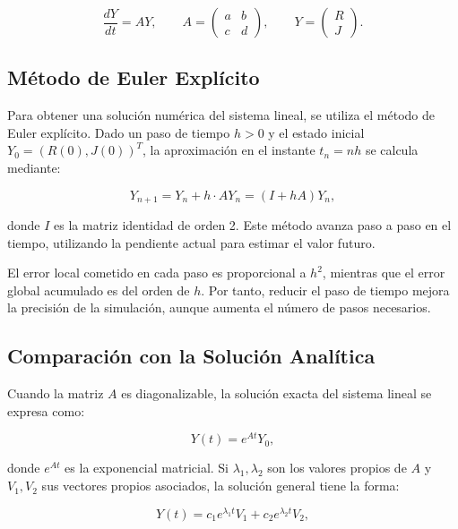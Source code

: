 \documentclass[12pt]{article}
\begin{document}
\begin{equation}
\frac{dY}{dt} = AY, \qquad
A = \begin{pmatrix} a & b \\ c & d \end{pmatrix}, \qquad
Y = \begin{pmatrix} R \\ J \end{pmatrix}.
\end{equation}

\subsection{Método de Euler Explícito}

Para obtener una solución numérica del sistema lineal, se utiliza el método de Euler explícito. Dado un paso de tiempo $h > 0$ y el estado inicial $Y_0 = (R(0), J(0))^T$, la aproximación en el instante $t_n = nh$ se calcula mediante:

\begin{equation}
Y_{n+1} = Y_n + h \cdot A Y_n = (I + hA) Y_n,
\end{equation}

donde $I$ es la matriz identidad de orden 2. Este método avanza paso a paso en el tiempo, utilizando la pendiente actual para estimar el valor futuro.

El error local cometido en cada paso es proporcional a $h^2$, mientras que el error global acumulado es del orden de $h$. Por tanto, reducir el paso de tiempo mejora la precisión de la simulación, aunque aumenta el número de pasos necesarios.

\subsection{Comparación con la Solución Analítica}

Cuando la matriz $A$ es diagonalizable, la solución exacta del sistema lineal se expresa como:

\begin{equation}
Y(t) = e^{At} Y_0,
\end{equation}

donde $e^{At}$ es la exponencial matricial. Si $\lambda_1, \lambda_2$ son los valores propios de $A$ y $V_1, V_2$ sus vectores propios asociados, la solución general tiene la forma:

\begin{equation}
Y(t) = c_1 e^{\lambda_1 t} V_1 + c_2 e^{\lambda_2 t} V_2,
\end{equation}
\end{document}
